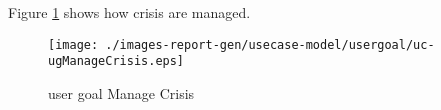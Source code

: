 \begin{usecase}

\end{usecase} 


Figure \ref{fig:lu.uni.lassy.excalibur.MyCrash.G02-RE-UCD-uc-ugManageCrisis}
shows how crisis are managed.

\begin{figure}[htbp]
\begin{center}

\texttt{[image: ./images-report-gen/usecase-model/usergoal/uc-ugManageCrisis.eps]}
\end{center}
\caption[lu.uni.lassy.excalibur.MyCrash.G02 Use Case Diagram: uc-ugManageCrisis]{user goal Manage Crisis}
\label{fig:lu.uni.lassy.excalibur.MyCrash.G02-RE-UCD-uc-ugManageCrisis}
\end{figure}
\vspace{0.5cm}

